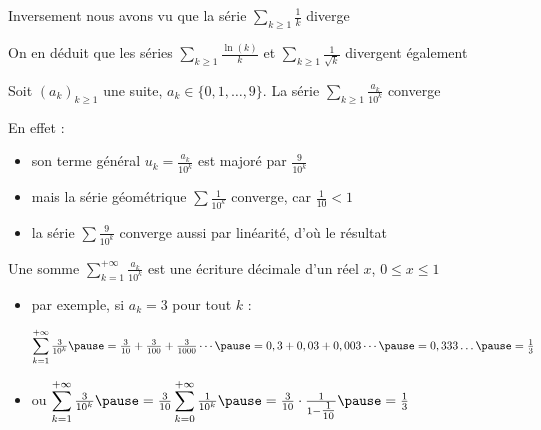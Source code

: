 \begin{frame}
\begin{exemple}
Inversement nous avons vu que la série $\displaystyle\sum_{k\ge1} \frac{1}{k}$ diverge 

\pause
On en déduit que les séries 
$\displaystyle\sum_{k\ge1} \frac{\ln(k)}{k}$ et $\displaystyle\sum_{k\ge1} \frac{1}{\sqrt{k}}$ divergent également
\end{exemple}

\end{frame}

\begin{frame}

\begin{exemple}
Soit $(a_k)_{k\ge 1}$ une suite, $a_k\in\{0,1,\ldots,9\}$. La série $\displaystyle \sum_{k\geq1} \frac{a_k}{10^k}$ converge

\pause
\vspace{-.1cm}
En effet :
\begin{itemize}
\item son terme général $u_k=\frac{a_k}{10^k}$ est majoré par $\frac{9}{10^k}$
\item\pause mais la série géométrique $\sum \frac{1}{10^k}$ converge, car $\frac{1}{10}<1$
\item\pause la série $\sum \frac{9}{10^k}$ converge aussi par linéarité, d'où le résultat
\end{itemize}
\vspace{.1cm}

\pause
Une somme $\displaystyle\sum_{k=1}^{+\infty} \frac{a_k}{10^k}$ est une écriture décimale d'un réel
$x$, $0 \le x \le 1$

\begin{itemize}
\item\pause par exemple, si $a_k = 3$ pour tout $k$ : 

\hspace{-.9cm}
$\displaystyle\sum_{k=1}^{+\infty} \tfrac{3}{10^k} 
\pause= \tfrac{3}{10}+\tfrac{3}{100}+\tfrac{3}{1000}\cdots
\pause= 0,3+0,03+0,003\cdots \pause= 0,333\ldots \pause= \tfrac13$
\item\pause ou
$\displaystyle\sum_{k=1}^{+\infty} \tfrac{3}{10^k} 
\pause= \tfrac{3}{10} \displaystyle\sum_{k=0}^{+\infty} \tfrac{1}{10^k}
\pause=  \tfrac{3}{10} \cdot \tfrac{1}{1-\tfrac{1}{10}}
\pause= \tfrac13$
\end{itemize}
\end{exemple}

\end{frame}


